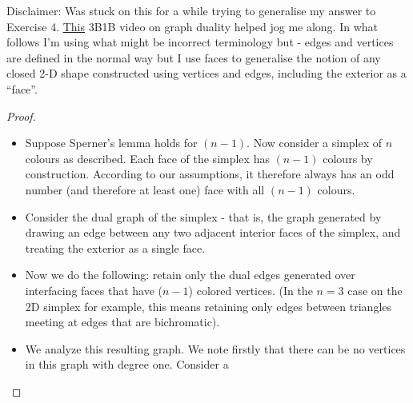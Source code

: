 \documentclass[12pt]{article}
\begin{document}
Disclaimer: Was stuck on this for a while trying to generalise my answer to Exercise 4. \href{https://www.youtube.com/watch?v=-9OUyo8NFZg}{This} 3B1B video on graph duality helped jog me along. In what follows I'm using what might be incorrect terminology but - edges and vertices are defined in the normal way but I use faces to generalise the notion of any closed 2-D shape constructed using vertices and edges, including the exterior as a ``face''.

\begin{proof}
    \begin{itemize}
        \item Suppose Sperner's lemma holds for $(n-1)$. Now consider a simplex of $n$ colours as described. Each face of the simplex has $(n-1)$ colours by construction. According to our assumptions, it therefore always has an odd number (and therefore at least one) face with all $(n-1)$ colours.
        \item Consider the dual graph of the simplex - that is, the graph generated by drawing an edge between any two adjacent interior faces of the simplex, and treating the exterior as a single face.
        \item Now we do the following: retain only the dual edges generated over interfacing faces that have ($n-1$) colored vertices. (In the $n=3$ case on the 2D simplex for example, this means retaining only edges between triangles meeting at edges that are bichromatic).
        \item We analyze this resulting graph. We note firstly that there can be no vertices in this graph with degree one. Consider a  
    \end{itemize}
\end{proof}
\end{document}
